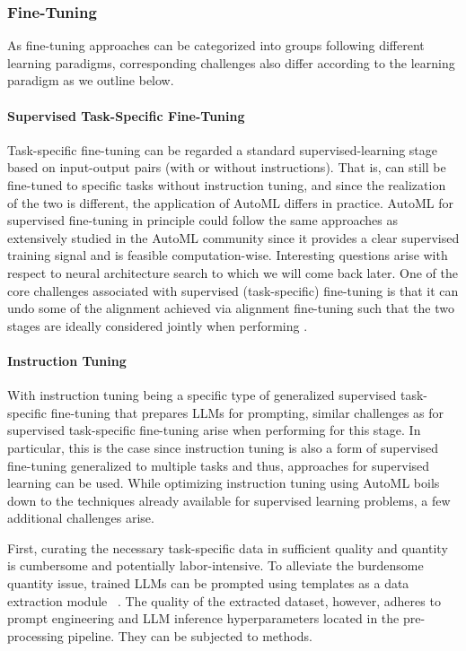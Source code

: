 \documentclass[10pt]{article} %
\begin{document}
\subsubsection{Fine-Tuning}
As fine-tuning approaches can be categorized into groups following different learning paradigms, corresponding challenges also differ according to the learning paradigm as we outline below.

\paragraph{Supervised Task-Specific Fine-Tuning} 
Task-specific fine-tuning can be regarded a standard supervised-learning stage based on input-output pairs (with or without instructions). That is, \LLMs can still be fine-tuned to specific tasks without instruction tuning, and since the realization of the two is different, the application of AutoML differs in practice. AutoML for supervised fine-tuning in principle could follow the same approaches as extensively studied in the AutoML community since it provides a clear supervised training signal and is feasible computation-wise. Interesting questions arise with respect to neural architecture search to which we will come back later. One of the core challenges associated with supervised (task-specific) fine-tuning is that it can undo some of the alignment achieved via alignment fine-tuning \citep{qi-arxiv23a} such that the two stages are ideally considered jointly when performing \HPO.

\paragraph{Instruction Tuning}
With instruction tuning being a specific type of generalized supervised task-specific fine-tuning \citep{wei-iclr22a} that prepares LLMs for prompting, similar challenges as for supervised task-specific fine-tuning arise when performing \AutoML for this stage.
In particular, this is the case since instruction tuning is also a form of supervised fine-tuning generalized to multiple tasks and thus, \AutoML approaches for supervised learning can be used. While optimizing instruction tuning using AutoML boils down to the techniques already available for supervised learning problems, a few additional challenges arise.

First, curating the necessary task-specific data in sufficient quality and quantity is cumbersome and potentially labor-intensive.
To alleviate the burdensome quantity issue, trained LLMs can be prompted using templates as a data extraction module ~\citep{zhang-arxiv23c}.
The quality of the extracted dataset, however, adheres to prompt engineering and LLM inference hyperparameters located in the pre-processing pipeline. 
They can be subjected to \AutoML methods.
\end{document}
